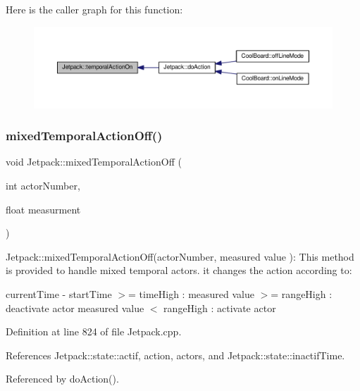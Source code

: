 Here is the caller graph for this function\+:
\nopagebreak
\begin{figure}[H]
\begin{center}
\leavevmode
\includegraphics[width=350pt]{df/d1d/class_jetpack_ad011d904f639accb5f94ef806846ef59_icgraph}
\end{center}
\end{figure}
\mbox{\label{class_jetpack_af2f567ef6311a8fc2f7bb948837667b7}} 
\subsubsection{\texorpdfstring{mixed\+Temporal\+Action\+Off()}{mixedTemporalActionOff()}}
{\footnotesize\ttfamily void Jetpack\+::mixed\+Temporal\+Action\+Off (\begin{DoxyParamCaption}\item[{int}]{actor\+Number,  }\item[{float}]{measurment }\end{DoxyParamCaption})}

Jetpack\+::mixed\+Temporal\+Action\+Off(actor\+Number, measured value )\+: This method is provided to handle mixed temporal actors. it changes the action according to\+:

current\+Time -\/ start\+Time $>$= time\+High \+: measured value $>$= range\+High \+: deactivate actor measured value $<$ range\+High \+: activate actor 

Definition at line 824 of file Jetpack.\+cpp.



References Jetpack\+::state\+::actif, action, actors, and Jetpack\+::state\+::inactif\+Time.



Referenced by do\+Action().

